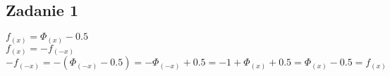 \subsection{Zadanie 1}

$f_{(x)} = \Phi_{(x)} - 0.5$\\
$f_{(x)} = -f_{(-x)}$\\
$-f_{(-x)} = -(\Phi_{(-x)} - 0.5) = -\Phi_{(-x)} + 0.5 = -1 +\Phi_{(x)} + 0.5 = \Phi_{(x)} - 0.5 = f_{(x)}$

